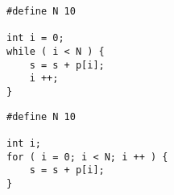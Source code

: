 \begin{code}
\centering
	\caption{Confronto tra il ciclo \lstinline!while()! ed il ciclo \lstinline!for()!.}
	\label{cod:for()}
\begin{minipage}{0.45\columnwidth}
	\begin{lstlisting}
#define N 10

int i = 0;
while ( i < N ) {
	s = s + p[i];
	i ++;
}
	\end{lstlisting}
\end{minipage}	\hfill
\begin{minipage}{0.45\columnwidth}
	\begin{lstlisting}
#define N 10

int i;
for ( i = 0; i < N; i ++ ) {
	s = s + p[i];
}
	\end{lstlisting}
\end{minipage}
\end{code}
